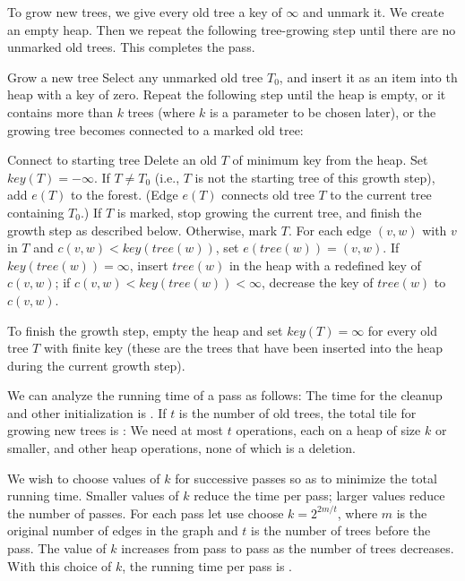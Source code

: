 To grow new trees, we give every old tree a key of \(\infty\) and unmark it. We
create an empty heap. Then we repeat the following tree-growing step until there are
no unmarked old trees. This completes the pass.

\begin{step}{Grow a new tree}
	Select any unmarked old tree \(T_0\), and insert it as an item into th heap with
	a key of zero. Repeat the following step until the heap is empty, or it contains
	more than \(k\) trees (where \(k\) is a parameter to be chosen later), or the
	growing tree becomes connected to a marked old tree:

	\begin{step}{Connect to starting tree}
		Delete an old \(T\) of minimum key from the heap. Set \(key(T) = -\infty\).
		If \(T \neq T_0\) (i.e., \(T\) is not the starting tree of this growth step),
		add \(e(T)\) to the forest. (Edge \(e(T)\) connects old tree \(T\) to the
		current tree containing \(T_0\).) If \(T\) is marked, stop growing the
		current tree, and finish the growth step as described below. Otherwise, mark
		\(T\). For each edge \((v, w)\) with \(v\) in \(T\) and \(c(v, w)
		< key(tree(w))\), set \(e(tree(w)) = (v, w)\). If \(key(tree(w)) = \infty\),
		insert \(tree(w)\) in the heap with a redefined key of \(c(v, w)\); if \(c(v,
		w) < key(tree(w)) < \infty\), decrease the key of \(tree(w)\) to \(c(v, w)\).
	\end{step}

	To finish the growth step, empty the heap and set \(key(T) = \infty\) for every
	old tree \(T\) with finite key (these are the trees that have been inserted into
	the heap during the current growth step).
\end{step}

We can analyze the running time of a pass as follows: The time for the cleanup and
other initialization is . If \(t\) is the number of old trees, the total tile
for growing new trees is : We need at most \(t\) 
operations, each on a heap of size \(k\) or smaller, and  other heap
operations, none of which is a deletion.

We wish to choose values of \(k\) for successive passes so as to minimize the total
running time. Smaller values of \(k\) reduce the time per pass; larger values reduce
the number of passes. For each pass let use choose \(k = 2^{2m/t}\), where \(m\) is
the original number of edges in the graph and \(t\) is the number of trees before the
pass. The value of \(k\) increases from pass to pass as the number of trees
decreases. With this choice of \(k\), the running time per pass is .

